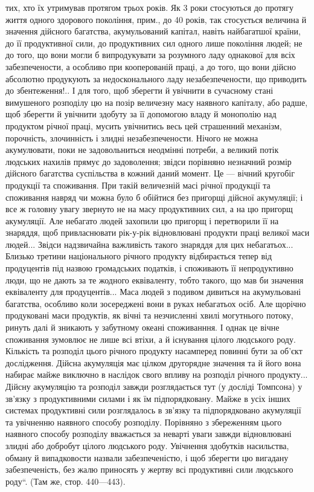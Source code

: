 тих, хто їх утримував протягом трьох років. Як 3 роки стосуються
до протягу життя одного здорового покоління, прим., до 40 років,
так стосується величина й значення дійсного багатства, акумульований
капітал, навіть найбагатшої країни, до її продуктивної сили, до продуктивних
сил одного лише покоління людей; не до того, що вони могли б
випродукувати за розумного ладу однакової для всіх забезпечености, а
особливо при кооперованій праці, а до того, що вони дійсно абсолютно
продукують за недосконального ладу незабезпечености, що приводить до
збентеження!.. І для того, щоб зберегти й увічнити в сучасному стані вимушеного
розподілу цю на позір величезну масу наявного капіталу, або радше,
щоб зберегти й увічнити здобуту за її допомогою владу й монополію
над продуктом річної праці, мусить увічнитись весь цей страшенний
механізм, порочність, злочинність і злидні незабезпечености. Нічого не
можна акумулювати, поки не задовольниться неодмінні потреби, а великий
потік людських нахилів прямує до задоволення; звідси порівняно незначний
розмір дійсного багатства суспільства в кожний даний момент.
Це — вічний кругобіг продукції та споживання. При такій величезній масі
річної продукції та споживання навряд чи можна було б обійтися без
пригорщі дійсної акумуляції; і все ж головну увагу звернуто не на
масу продуктивних сил, а на цю пригорщ акумуляції. Але небагато
людей захопили цю пригорщ і перетворили її на знаряддя, щоб
привласнювати рік-у-рік відновлювані продукти праці великої маси людей...
Звідси надзвичайна важливість такого знаряддя для цих небагатьох...
Близько третини національного річного продукту відбирається тепер від
продуцентів під назвою громадських податків, і споживають її непродуктивно
люди, що не дають за те жодного еквіваленту, тобто такого, що
мав би значення еквіваленту для продуцентів... Маса людей з подивом
дивиться на акумульовані багатства, особливо коли зосереджені вони в
руках небагатьох осіб. Але щорічно продуковані маси продуктів, як
вічні та незчисленні хвилі могутнього потоку, ринуть далі й зникають у
забутному океані споживанння. І однак це вічне споживання зумовлює
не лише всі втіхи, а й існування цілого людського роду. Кількість та
розподіл цього річного продукту насамперед повинні бути за об’єкт дослідження.
Дійсна акумуляція має цілком другорядне значення та й його
вона набирає майже виключно в наслідок свого впливу на розподіл річного
продукту... Дійсну акумуляцію та розподіл завжди розглядається тут
(у досліді Томпсона) у зв'язку з продуктивними силами і як їм підпорядковану.
Майже в усіх інших системах продуктивні сили розглядалось
в зв’язку та підпорядковано акумуляції та увічненню наявного
способу розподілу. Порівняно з збереженням цього наявного способу
розподілу вважається за неварті уваги завжди відновлювані злидні або
добробут цілого людського роду. Увічнення здобутків насильства, обману
й випадковости назвали забезпеченістю, і щоб зберегти цю вигадану
забезпеченість, без жалю приносять у жертву всі продуктивні сили
людського роду“. (Там же, стор. 440—443).
